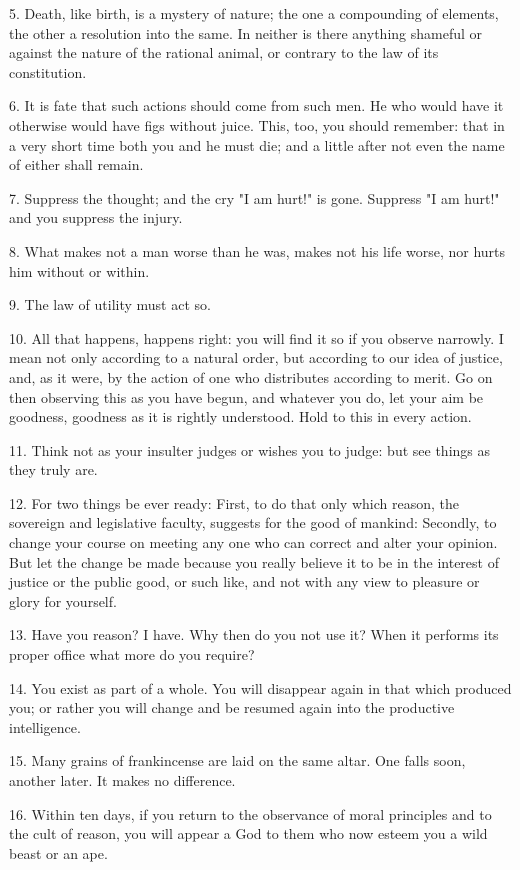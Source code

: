 \documentclass{book}
\begin{document}
5. Death, like birth, is a mystery of nature; the one a compounding of
elements, the other a resolution into the same. In neither is there
anything shameful or against the nature of the rational animal, or
contrary to the law of its constitution.

6. It is fate that such actions should come from such men. He who
would have it otherwise would have figs without juice. This, too, you
should remember: that in a very short time both you and he must die;
and a little after not even the name of either shall remain.

7. Suppress the thought; and the cry "I am hurt!" is gone. Suppress "I
am hurt!" and you suppress the injury.

8. What makes not a man worse than he was, makes not his life worse,
nor hurts him without or within.

9. The law of utility must act so.

10. All that happens, happens right: you will find it so if you
observe narrowly. I mean not only according to a natural order, but
according to our idea of justice, and, as it were, by the action of
one who distributes according to merit. Go on then observing this as
you have begun, and whatever you do, let your aim be goodness,
goodness as it is rightly understood. Hold to this in every action.

11. Think not as your insulter judges or wishes you to judge: but see
things as they truly are.

12. For two things be ever ready: First, to do that only which reason,
the sovereign and legislative faculty, suggests for the good of
mankind: Secondly, to change your course on meeting any one who can
correct and alter your opinion. But let the change be made because you
really believe it to be in the interest of justice or the public good,
or such like, and not with any view to pleasure or glory for yourself.

13. Have you reason? I have. Why then do you not use it? When it
performs its proper office what more do you require?

14. You exist as part of a whole. You will disappear again in that
which produced you; or rather you will change and be resumed again
into the productive intelligence.

15. Many grains of frankincense are laid on the same altar. One falls
soon, another later. It makes no difference.

16. Within ten days, if you return to the observance of moral
principles and to the cult of reason, you will appear a God to them
who now esteem you a wild beast or an ape.
\end{document}
